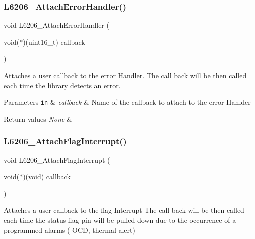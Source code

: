 \subsubsection{\texorpdfstring{L6206\+\_\+\+Attach\+Error\+Handler()}{L6206\_AttachErrorHandler()}}
{\footnotesize\ttfamily void L6206\+\_\+\+Attach\+Error\+Handler (\begin{DoxyParamCaption}\item[{void($\ast$)(uint16\+\_\+t)}]{callback }\end{DoxyParamCaption})}



Attaches a user callback to the error Handler. The call back will be then called each time the library detects an error. 


\begin{DoxyParams}[1]{Parameters}
\mbox{\tt in}  & {\em callback} & Name of the callback to attach to the error Hanlder \\
\hline
\end{DoxyParams}

\begin{DoxyRetVals}{Return values}
{\em None} & \\
\hline
\end{DoxyRetVals}
\mbox{\label{group___l6206___exported___functions_ga12328adaf12eddaa6c0a8b8f27960bb2}} 
\subsubsection{\texorpdfstring{L6206\+\_\+\+Attach\+Flag\+Interrupt()}{L6206\_AttachFlagInterrupt()}}
{\footnotesize\ttfamily void L6206\+\_\+\+Attach\+Flag\+Interrupt (\begin{DoxyParamCaption}\item[{void($\ast$)(void)}]{callback }\end{DoxyParamCaption})}



Attaches a user callback to the flag Interrupt The call back will be then called each time the status flag pin will be pulled down due to the occurrence of a programmed alarms ( O\+CD, thermal alert) 


